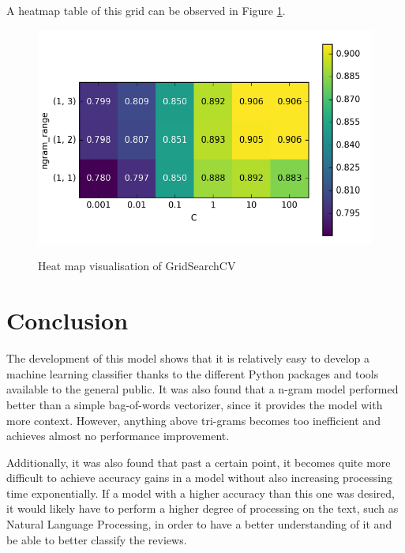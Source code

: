\documentclass[a4paper,12pt]{article}
\begin{document}
A heatmap table of this grid can be observed in Figure \ref{fig:heat}.

\begin{figure}[h]
    \centering
    \caption{Heat map visualisation of GridSearchCV}
    \includegraphics[scale=0.6]{images/heat.png}
    \label{fig:heat}
\end{figure}

\pagebreak

\section{Conclusion}

The development of this model shows that it is relatively easy to develop a
machine learning classifier thanks to the different Python packages and tools
available to the general public.
It was also found that a n-gram model performed better than a simple bag-of-words
vectorizer, since it provides the model with more context.
However, anything above tri-grams becomes too inefficient and achieves almost
no performance improvement.

Additionally, it was also found that past a certain point, it becomes quite
more difficult to achieve accuracy gains in a model without also increasing
processing time exponentially.
If a model with a higher accuracy than this one was desired, it would likely 
have to perform a higher degree of processing on the text, such as Natural
Language Processing, in order to have a better understanding of it and be able
to better classify the reviews.

\pagebreak

\printbibliography

\pagebreak
\end{document}
